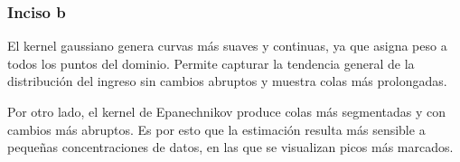 \documentclass[11pt,a4paper]{article}
\begin{document}
\subsubsection*{Inciso b}

El kernel gaussiano genera curvas más suaves y continuas, ya que asigna peso a todos los
puntos del dominio. Permite capturar la tendencia general de la distribución del ingreso sin
cambios abruptos y muestra colas más prolongadas.

Por otro lado, el kernel de Epanechnikov produce colas más segmentadas y con cambios más
abruptos. Es por esto que la estimación resulta más sensible a pequeñas concentraciones de
datos, en las que se visualizan picos más marcados.
\end{document}
